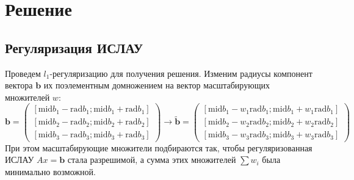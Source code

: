\section{Решение}

\subsection{Регуляризация ИСЛАУ}
Проведем $l_1$-регуляризацию для получения решения. Изменим радиусы компонент вектора $\textbf{b}$ их поэлементным домножением на вектор масштабирующих множителей $w$: \\
\begin{equation}
	\textbf{b}=
	\begin{pmatrix}
		[\text{mid} b_1 - \text{rad} b_1; \text{mid} b_1 + \text{rad} b_1] \\
		[\text{mid} b_2 - \text{rad} b_2; \text{mid} b_2 + \text{rad} b_2] \\
		[\text{mid} b_3 - \text{rad} b_3; \text{mid} b_3 + \text{rad} b_3]
	\end{pmatrix} \rightarrow \tilde{\textbf{b}} = 
	\begin{pmatrix}
		[\text{mid} b_1 - w_1 \text{rad} b_1; \text{mid} b_1 + w_1 \text{rad} b_1] \\
		[\text{mid} b_2 - w_2 \text{rad} b_2; \text{mid} b_2 + w_2 \text{rad} b_2] \\
		[\text{mid} b_3 - w_3 \text{rad} b_3; \text{mid} b_3 + w_3 \text{rad} b_3]
	\end{pmatrix}
\end{equation}
При этом масштабирующие множители подбираются так, чтобы регуляризованная ИСЛАУ $A x=\textbf{b}$ стала разрешимой, а сумма этих множителей $\sum w_i$ была минимально возможной. \\

